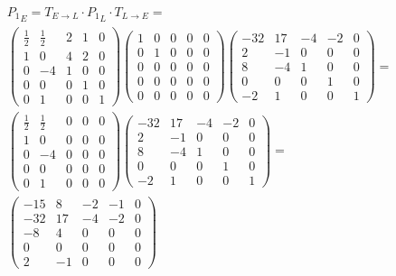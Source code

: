\documentclass[12pt, a4paper]{article}
\begin{document}
    \begin{multline}
        {P_1}_E = T_{E \to L} \cdot {P_1}_L \cdot T_{L \to E} = \\
        \left(\begin{matrix}
            \frac{1}{2} & \frac{1}{2} & 2 & 1 & 0 \\
            1 & 0 & 4 & 2 & 0 \\
            0 & -4 & 1 & 0 & 0 \\
            0 & 0 & 0 & 1 & 0 \\
            0 & 1 & 0 & 0 & 1
        \end{matrix}\right) \left(\begin{matrix}
            1 & 0 & 0 & 0 & 0 \\
            0 & 1 & 0 & 0 & 0 \\
            0 & 0 & 0 & 0 & 0 \\
            0 & 0 & 0 & 0 & 0 \\
            0 & 0 & 0 & 0 & 0
        \end{matrix}\right) \left(\begin{matrix}
            -32 & 17 & -4 & -2 & 0 \\
            2 & -1 & 0 & 0 & 0 \\
            8 & -4 & 1 & 0 & 0 \\
            0 & 0 & 0 & 1 & 0 \\
            -2 & 1 & 0 & 0 & 1
        \end{matrix}\right) = \\
        \left(\begin{matrix}
            \frac{1}{2} & \frac{1}{2} & 0 & 0 & 0 \\
            1 & 0 & 0 & 0 & 0 \\
            0 & -4 & 0 & 0 & 0 \\
            0 & 0 & 0 & 0 & 0 \\
            0 & 1 & 0 & 0 & 0
        \end{matrix}\right) \left(\begin{matrix}
            -32 & 17 & -4 & -2 & 0 \\
            2 & -1 & 0 & 0 & 0 \\
            8 & -4 & 1 & 0 & 0 \\
            0 & 0 & 0 & 1 & 0 \\
            -2 & 1 & 0 & 0 & 1
        \end{matrix}\right) = \\
        \left(\begin{matrix}
            -15 & 8 & -2 & -1 & 0 \\
            -32 & 17 & -4 & -2 & 0 \\
            -8 & 4 & 0 & 0 & 0 \\
            0 & 0 & 0 & 0 & 0 \\
            2 & -1 & 0 & 0 & 0
        \end{matrix}\right)
    \end{multline}
\end{document}
